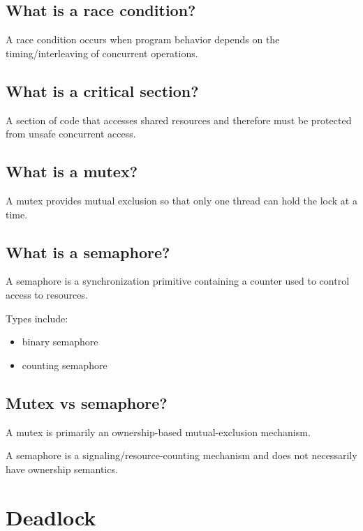 \subsection{What is a race condition?}

A race condition occurs when program behavior depends on the timing/interleaving of concurrent operations.

\medskip

\subsection{What is a critical section?}

A section of code that accesses shared resources and therefore must be protected from unsafe concurrent access.

\medskip

\subsection{What is a mutex?}

A mutex provides mutual exclusion so that only one thread can hold the lock at a time.

\medskip

\subsection{What is a semaphore?}

A semaphore is a synchronization primitive containing a counter used to control access to resources.

Types include:

\begin{itemize}
  \item binary semaphore
  \item counting semaphore
\end{itemize}

\medskip

\subsection{Mutex vs semaphore?}

A mutex is primarily an ownership-based mutual-exclusion mechanism.

A semaphore is a signaling/resource-counting mechanism and does not necessarily have ownership semantics.

\medskip

\section{Deadlock}

